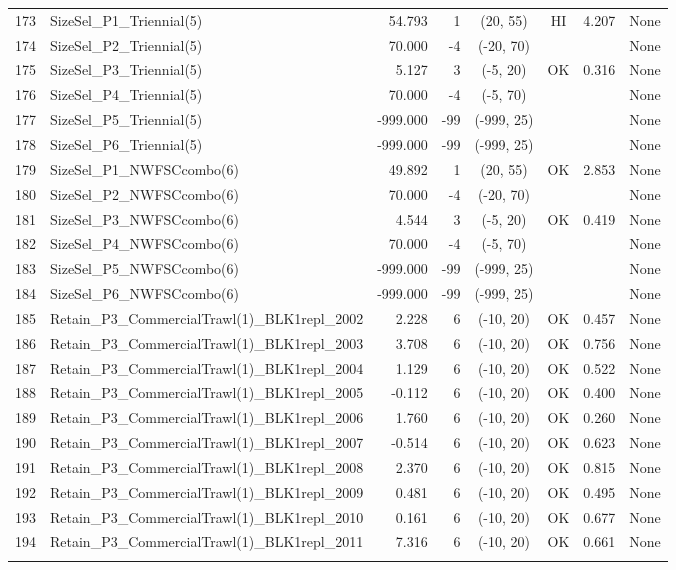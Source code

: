 \documentclass[12pt,]{article}
\begin{document}
\begin{landscape}
\begin{longtable}{rlrrcccl}
  173 & SizeSel\_P1\_Triennial(5) & 54.793 & 1 & (20, 55) & HI & 4.207 & None \\ 
  174 & SizeSel\_P2\_Triennial(5) & 70.000 & -4 & (-20, 70) &  &  & None \\ 
  175 & SizeSel\_P3\_Triennial(5) & 5.127 & 3 & (-5, 20) & OK & 0.316 & None \\ 
  176 & SizeSel\_P4\_Triennial(5) & 70.000 & -4 & (-5, 70) &  &  & None \\ 
  177 & SizeSel\_P5\_Triennial(5) & -999.000 & -99 & (-999, 25) &  &  & None \\ 
  178 & SizeSel\_P6\_Triennial(5) & -999.000 & -99 & (-999, 25) &  &  & None \\ 
  179 & SizeSel\_P1\_NWFSCcombo(6) & 49.892 & 1 & (20, 55) & OK & 2.853 & None \\ 
  180 & SizeSel\_P2\_NWFSCcombo(6) & 70.000 & -4 & (-20, 70) &  &  & None \\ 
  181 & SizeSel\_P3\_NWFSCcombo(6) & 4.544 & 3 & (-5, 20) & OK & 0.419 & None \\ 
  182 & SizeSel\_P4\_NWFSCcombo(6) & 70.000 & -4 & (-5, 70) &  &  & None \\ 
  183 & SizeSel\_P5\_NWFSCcombo(6) & -999.000 & -99 & (-999, 25) &  &  & None \\ 
  184 & SizeSel\_P6\_NWFSCcombo(6) & -999.000 & -99 & (-999, 25) &  &  & None \\ 
  185 & Retain\_P3\_CommercialTrawl(1)\_BLK1repl\_2002 & 2.228 & 6 & (-10, 20) & OK & 0.457 & None \\ 
  186 & Retain\_P3\_CommercialTrawl(1)\_BLK1repl\_2003 & 3.708 & 6 & (-10, 20) & OK & 0.756 & None \\ 
  187 & Retain\_P3\_CommercialTrawl(1)\_BLK1repl\_2004 & 1.129 & 6 & (-10, 20) & OK & 0.522 & None \\ 
  188 & Retain\_P3\_CommercialTrawl(1)\_BLK1repl\_2005 & -0.112 & 6 & (-10, 20) & OK & 0.400 & None \\ 
  189 & Retain\_P3\_CommercialTrawl(1)\_BLK1repl\_2006 & 1.760 & 6 & (-10, 20) & OK & 0.260 & None \\ 
  190 & Retain\_P3\_CommercialTrawl(1)\_BLK1repl\_2007 & -0.514 & 6 & (-10, 20) & OK & 0.623 & None \\ 
  191 & Retain\_P3\_CommercialTrawl(1)\_BLK1repl\_2008 & 2.370 & 6 & (-10, 20) & OK & 0.815 & None \\ 
  192 & Retain\_P3\_CommercialTrawl(1)\_BLK1repl\_2009 & 0.481 & 6 & (-10, 20) & OK & 0.495 & None \\ 
  193 & Retain\_P3\_CommercialTrawl(1)\_BLK1repl\_2010 & 0.161 & 6 & (-10, 20) & OK & 0.677 & None \\ 
  194 & Retain\_P3\_CommercialTrawl(1)\_BLK1repl\_2011 & 7.316 & 6 & (-10, 20) & OK & 0.661 & None \\ 
   \hline
\hline
\label{tab:model_params}
\end{longtable}
\end{landscape}
\end{document}
